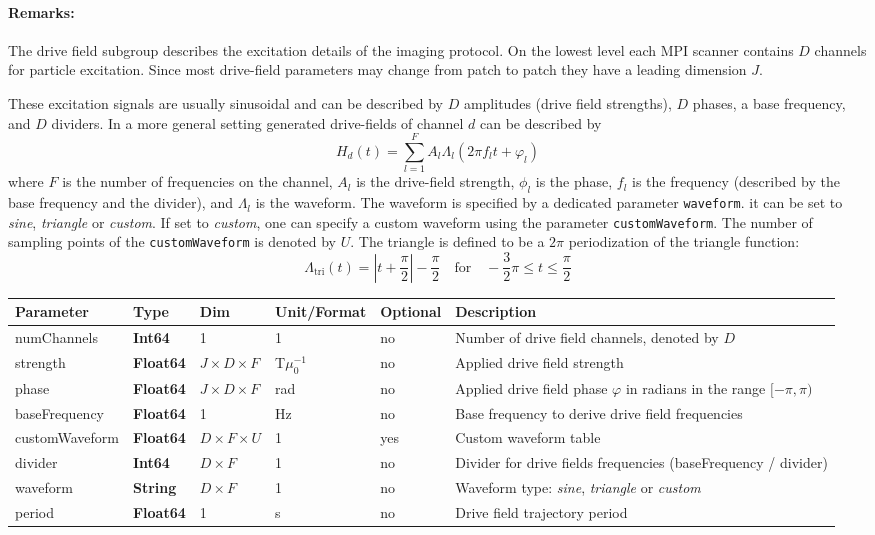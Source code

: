 \documentclass[landscape,a4paper]{article} %
\newcommand{\inl}[1]{\lstinline[columns=fixed]{#1}}
\newcommand{\inltab}[1]{{\ttfamily\bfseries\color{blue}#1}}
\newcommand{\inlvar}[1]{{\ttfamily#1}}
\begin{document}
\begin{multicols}{2}
\paragraph{Remarks:} The drive field subgroup describes the excitation details of the imaging protocol. On the lowest level each MPI scanner contains $D$ channels for particle excitation. Since most drive-field parameters may change from patch to patch they have a leading dimension $J$.

These excitation signals are usually sinusoidal and can be described by $D$ amplitudes (drive field strengths), $D$ phases, a base frequency, and $D$ dividers. In a more general setting generated drive-fields of channel $d$ can be described by
$$
H_d(t) = \sum_{l=1}^{F} A_l \Lambda_l (2\pi f_l t + \varphi_l)
$$
where $F$ is the number of frequencies on the channel, $A_l$ is the drive-field strength, $\phi_l$ is the phase, $f_l$ is the frequency (described by the base frequency and the divider), and $\Lambda_l$ is the waveform. The waveform is specified by a dedicated parameter \inl{waveform}. it can be set to \textit{sine}, \textit{triangle} or \textit{custom}. If set to \textit{custom}, one can specify a custom waveform using the parameter \inl{customWaveform}. The number of sampling points of the \inl{customWaveform} is denoted by $U$. The triangle is defined to be a $2\pi$ periodization of the
triangle function:
$$
 \Lambda_\text{tri}(t) = \left\vert t+\frac{\pi}{2}\right\vert - \frac{\pi}{2} \quad \text{for} \quad -\frac{3}{2}\pi\leq t \leq \frac{\pi}{2}
$$
\end{multicols}

\noindent \begin{tabularx}{\columnwidth}{lllllX} 
\textbf{Parameter} & \textbf{Type} & \textbf{Dim} & \textbf{Unit/Format} & \textbf{Optional} & \textbf{Description} \\ \hline 
\inlvar{numChannels} & \inltab{Int64} & 1 & 1 & no & Number of drive field channels, denoted by $D$ \\ \hline
\inlvar{strength} & \inltab{Float64} & $J \times D \times F $ & T$\mu_0^{-1}$ & no & Applied drive field strength \\ \hline
\inlvar{phase} & \inltab{Float64} & $J \times D \times F$ & rad & no & Applied drive field phase $\varphi$ in radians in the range $[-\pi,\pi)$ \\ \hline
\inlvar{baseFrequency} & \inltab{Float64} & 1 & Hz & no & Base frequency to derive drive field frequencies \\ \hline
\inlvar{customWaveform} & \inltab{Float64} & $D \times F \times U$ & 1 & yes & Custom waveform table \\ \hline
\inlvar{divider} & \inltab{Int64} & $D \times F$ & 1 & no & Divider for drive fields frequencies (\inlvar{baseFrequency} / \inlvar{divider}) \\ \hline
\inlvar{waveform} & \inltab{String} & $D \times F$ & 1 & no & Waveform type: \textit{sine}, \textit{triangle} or \textit{custom} \\ \hline
\inlvar{period} & \inltab{Float64} & 1 & s & no & Drive field trajectory period \\ \hline
\end{tabularx}
\end{document}

